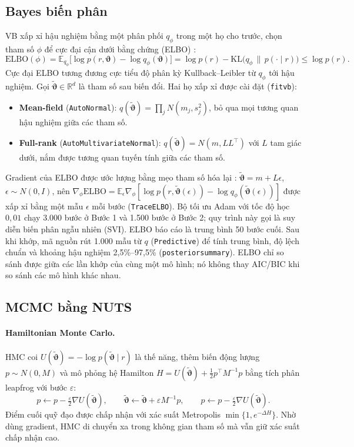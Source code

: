 \documentclass[11pt,a4paper]{article}
\renewcommand{\_}{\gachduoi\allowbreak}
\newcommand{\ham}[1]{\texttt{#1}}
\newcommand{\E}{\mathbb{E}}
\newcommand{\R}{\mathbb{R}}
\newcommand{\btheta}{\boldsymbol\vartheta}
\begin{document}
\subsection{Bayes biến phân}\label{sec:vb}
VB xấp xỉ hậu nghiệm bằng một phân phối $q_\phi$ trong một họ cho trước, chọn tham số $\phi$ để cực đại cận dưới bằng chứng (ELBO) \cite{blei2017vi}:
\begin{equation}
\mathrm{ELBO}(\phi)=\E_{q_\phi}\bigl[\log p(r,\btheta)-\log q_\phi(\btheta)\bigr]=\log p(r)-\mathrm{KL}\bigl(q_\phi\,\|\,p(\cdot\mid r)\bigr)\le\log p(r).
\end{equation}
Cực đại ELBO tương đương cực tiểu độ phân kỳ Kullback–Leibler từ $q_\phi$ tới hậu nghiệm. Gọi $\tilde{\btheta}\in\R^d$ là tham số sau biến đổi. Hai họ xấp xỉ được cài đặt (\ham{fit\_vb}):
\begin{itemize}
\item \textbf{Mean-field} (\ham{AutoNormal}): $q(\tilde{\btheta})=\prod_{j}N(m_j,s_j^2)$, bỏ qua mọi tương quan hậu nghiệm giữa các tham số.
\item \textbf{Full-rank} (\ham{AutoMultivariateNormal}): $q(\tilde{\btheta})=N(m,LL^{\!\top})$ với $L$ tam giác dưới, nắm được tương quan tuyến tính giữa các tham số.
\end{itemize}
Gradient của ELBO được ước lượng bằng mẹo tham số hóa lại \cite{kingma2014vae}: $\tilde{\btheta}=m+L\epsilon$, $\epsilon\sim N(0,I)$, nên $\nabla_\phi\mathrm{ELBO}=\E_\epsilon\nabla_\phi[\log p(r,\tilde{\btheta}(\epsilon))-\log q_\phi(\tilde{\btheta}(\epsilon))]$ được xấp xỉ bằng một mẫu $\epsilon$ mỗi bước (\ham{Trace\_ELBO}). Bộ tối ưu Adam với tốc độ học $0{,}01$ chạy 3.000 bước ở Bước 1 và 1.500 bước ở Bước 2; quy trình này gọi là suy diễn biến phân ngẫu nhiên (SVI). ELBO báo cáo là trung bình 50 bước cuối. Sau khi khớp, mã nguồn rút 1.000 mẫu từ $q$ (\ham{Predictive}) để tính trung bình, độ lệch chuẩn và khoảng hậu nghiệm 2,5\%--97,5\% (\ham{posterior\_summary}). ELBO chỉ so sánh được giữa các lần khớp của cùng một mô hình; nó không thay AIC/BIC khi so sánh các mô hình khác nhau.

\subsection{MCMC bằng NUTS}\label{sec:mcmc}
\paragraph{Hamiltonian Monte Carlo.} HMC \cite{neal2011hmc} coi $U(\tilde{\btheta})=-\log p(\tilde{\btheta}\mid r)$ là thế năng, thêm biến động lượng $p\sim N(0,M)$ và mô phỏng hệ Hamilton $H=U(\tilde{\btheta})+\tfrac12p^{\!\top}M^{-1}p$ bằng tích phân leapfrog với bước $\varepsilon$:
\begin{equation}
p\leftarrow p-\tfrac{\varepsilon}{2}\nabla U(\tilde{\btheta}),\qquad
\tilde{\btheta}\leftarrow\tilde{\btheta}+\varepsilon M^{-1}p,\qquad
p\leftarrow p-\tfrac{\varepsilon}{2}\nabla U(\tilde{\btheta}).
\end{equation}
Điểm cuối quỹ đạo được chấp nhận với xác suất Metropolis $\min\{1,e^{-\Delta H}\}$. Nhờ dùng gradient, HMC di chuyển xa trong không gian tham số mà vẫn giữ xác suất chấp nhận cao.
\end{document}
